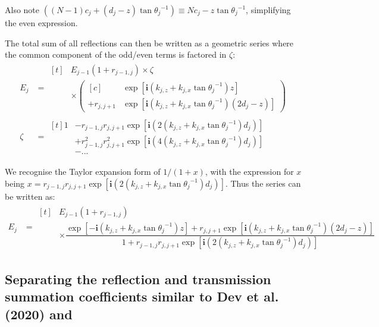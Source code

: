 \documentclass[../main.tex]{subfiles}
\begin{document}
	Also note $\left((N-1) c_{j} + (d_j-z){\tan\theta_j}^{-1}\right) \equiv Nc_j - z{\tan\theta_j}^{-1}$, simplifying the even expression.

	The total sum of all reflections can then be written as a geometric series where the common component of the odd/even terms is factored in $\zeta$:
	\begin{align}
		E_j &= 
		\begin{aligned}[t]
			&E_{j-1}(1+r_{j-1,j}) \times \zeta \\
			&\times \left(
			\begin{aligned}[c]
				&\exp\left[\mathbf{i}\left( k_{j,z} + k_{j,x}{\tan\theta_j}^{-1}\right)z\right]\\
				+ r_{j, j+1} 
				&\exp\left[\mathbf{i}\left( k_{j,z} + k_{j,x}{\tan\theta_j}^{-1}\right)\left(2d_j - z\right)\right]
			\end{aligned}
			\right)
		\end{aligned}\\
		\zeta &= \begin{aligned}[t]
			1 &- r_{j-1,j}r_{j,j+1}\exp\left[\mathbf{i}(2(k_{j,z} + k_{j,x}{\tan\theta_j}^{-1}) d_j)\right] \\
			&+ r_{j-1,j}^2r_{j,j+1}^2\exp\left[\mathbf{i}(4(k_{j,z} + k_{j,x}{\tan\theta_j}^{-1}) d_j)\right]\\
			&- ...
		\end{aligned}
	\end{align}

	We recognise the Taylor expansion form of $1/(1+x)$, with the expression for $x$ being $x=r_{j-1,j}r_{j,j+1}\exp\left[\mathbf{i}(2(k_{j,z} + k_{j,x}{\tan\theta_j}^{-1}) d_j)\right]$. Thus the series can be written as:
	\begin{align}
		E_j &= \begin{aligned}[t]
			&E_{j-1}\left(1 + r_{j-1,j}\right)\\
			&\times
			\dfrac{
					\exp\left[-\mathbf{i}(k_{j,z} + k_{j,x}{\tan\theta_j}^{-1}) z\right]
					+ 	r_{j,j+1} 
						\exp\left[\mathbf{i}(k_{j,z} + k_{j,x}{\tan\theta_j}^{-1})(2d_j - z)\right]
				}
				{1 + r_{j-1,j}r_{j,j+1}
				\exp\left[\mathbf{i}(2 (k_{j,z} + k_{j,x}{\tan\theta_j}^{-1}) d_j)\right]
				}
		\end{aligned}
	\end{align}

	\subsection{Separating the reflection and transmission summation coefficients similar to Dev et al. (2020) and }

	


	\ifSubfilesClassLoaded{
		\printbibliography{}
		\printglossaries
	}{} %
	
\end{document}
